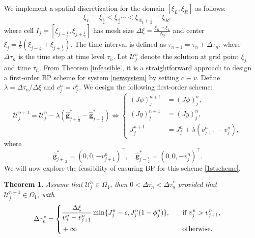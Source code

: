 \documentclass[times,final,11pt]{elsarticle}
\newtheorem{theorem}{Theorem}[section]
\numberwithin{equation}{section}
\theoremstyle{definition}
\theoremstyle{remark}
\begin{document}
We implement a spatial discretization for the domain $[\xi_L, \xi_R]$ as follows:
\begin{equation*}
	\xi_L = \xi_{\frac{1}{2}} < \xi_{\frac{3}{2}} \cdots < \xi_{N_\xi + \frac{1}{2}} = \xi_R,
\end{equation*}
where cell $I_j = [\xi_{j - \frac{1}{2}}, \xi_{j + \frac{1}{2}}]$ has mesh size $\Delta \xi = \frac{\xi_R - \xi_L}{N_\xi}$ and center $\xi_{j} = \frac{1}{2} \left(\xi_{j - \frac{1}{2}} + \xi_{j + \frac{1}{2}} \right)$. The time interval is defined as $\tau_{n + 1} = \tau_n + \Delta \tau_n$, where $\Delta \tau_n$ is the time step at time level $\tau_n$. Let $\boldsymbol{\mathcal{U}}_j^{n}$ denote the solution at grid point $\xi_j$ and time $\tau_n$. From Theorem \ref{infeasible}, it is a straightforward approach to design a first-order BP scheme for system \ref{newsystem} by setting $c \equiv v$. Define $\lambda = \Delta \tau_n / \Delta \xi$ and $c_j^n = v_j^n$. We design the following first-order scheme:
\begin{equation}\label{1stscheme}
    \boldsymbol{\mathcal{U}}_j^{n + 1} = \boldsymbol{\mathcal{U}}_j^{n} - \lambda \left(\widehat{\mathbf{g}}_{j + \frac{1}{2}}^* - \widehat{\mathbf{g}}_{j - \frac{1}{2}}^*\right) \Leftrightarrow \left\{
    \begin{aligned}
        (J \phi)_j^{n + 1} &= (J \phi)_j^{n}, \\
        (J y)_j^{n + 1} &= (J y)_j^{n}, \\
        J_j^{n + 1} &= J_j^n + \lambda ( v_{j + 1}^n - v_j^n ),
    \end{aligned}
    \right.
\end{equation}
where 
\begin{equation}
\label{g}
	\widehat{\mathbf{g}}_{j + \frac{1}{2}}^* = (0, 0, - v^n_{j + 1})^\top, \quad \widehat{\mathbf{g}}_{j - \frac{1}{2}}^* = (0, 0, - v^n_{j})^\top.
\end{equation}
We will now explore the feasibility of ensuring BP for this scheme \eqref{1stscheme}.
\begin{theorem}
\label{TH8}
	Assume that $\boldsymbol{\mathcal{U}}_j^n \in \Omega_1$, then $0 < \Delta \tau_n < \Delta \tau_n^{*}$ provided that $\boldsymbol{\mathcal{U}}_j^{n + 1} \in \Omega_1$, with 
	\begin{equation*}
	    \Delta \tau_n^{*} = \left\{ 
	    \begin{aligned}
	        &\frac{\Delta \xi }{v_j^n - v_{j + 1}^n} \min \{J_j^n - \epsilon, J_j^n (1 - \phi_j^n)\}, \quad &&{\rm if} \; v_j^n > v_{j + 1}^n,\\
	        &+ \infty \quad &&{\rm otherwise}.
	    \end{aligned}
	    \right.
	\end{equation*}
\end{theorem}
\end{document}
